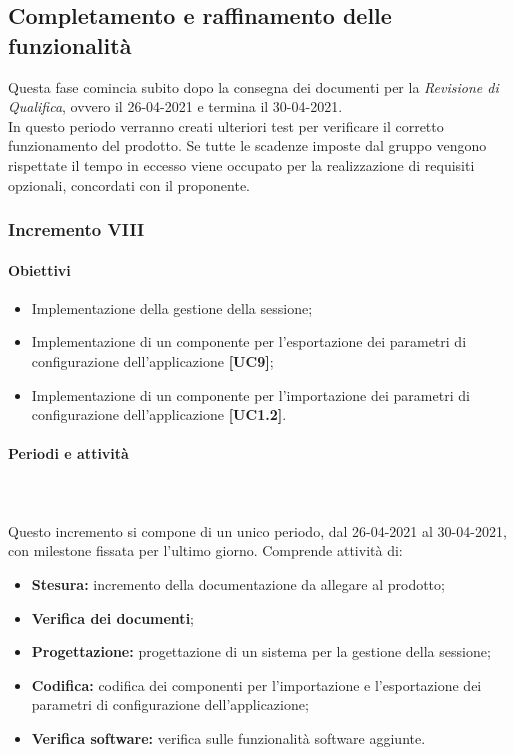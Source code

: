 \subsection{Completamento e raffinamento delle funzionalità}
Questa fase comincia subito dopo la consegna dei documenti per la \textit{Revisione di Qualifica}, ovvero il 26-04-2021 e termina il 30-04-2021.\\
In questo periodo verranno creati ulteriori test per verificare il corretto funzionamento del prodotto. Se tutte le scadenze imposte dal gruppo vengono rispettate il tempo in eccesso viene occupato per la realizzazione di requisiti opzionali, concordati con il proponente. 

\subsubsection{Incremento VIII} 

\paragraph{Obiettivi}
\begin{itemize}
	\item Implementazione della gestione della sessione;
	\item Implementazione di un componente per l'esportazione dei parametri di configurazione dell'applicazione \textbf{[UC9]};
	\item Implementazione di un componente per l'importazione dei parametri di configurazione dell'applicazione \textbf{[UC1.2]}.
\end{itemize}
	
\paragraph{Periodi e attività} \mbox{}\\\mbox{}\\
Questo incremento si compone di un unico periodo, dal  26-04-2021 al 30-04-2021, con milestone fissata per l'ultimo giorno. Comprende attività di:	
\begin{itemize}
\item \textbf{Stesura:} incremento della documentazione da allegare al prodotto;
\item \textbf{Verifica dei documenti};
\item \textbf{Progettazione:} progettazione di un sistema per la gestione della sessione;
\item \textbf{Codifica:} codifica dei componenti per l'importazione e l'esportazione dei parametri di configurazione dell'applicazione;
\item \textbf{Verifica software:} verifica sulle funzionalità software aggiunte.
\end{itemize}

